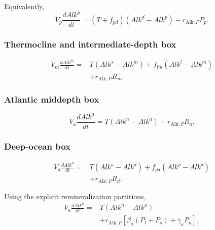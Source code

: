 \documentclass[11pt]{article}
\begin{document}
Equivalently,
\begin{equation}
V_p\frac{dAlk^p}{dt}
=
\left(T+f_{pd}\right)
\left(
Alk^d-Alk^p
\right)
-
r_{\mathrm{Alk}:P}P_p.
\label{eq:seven_alk_p_compact}
\end{equation}

\subsubsection{Thermocline and intermediate-depth box}

\begin{equation}
\begin{split}
V_m\frac{dAlk^m}{dt}
={}&
T
\left(
Alk^s-Alk^m
\right)
+
f_{lm}
\left(
Alk^l-Alk^m
\right)
\\
&+
r_{\mathrm{Alk}:P}R_m.
\end{split}
\label{eq:seven_alk_m}
\end{equation}

\subsubsection{Atlantic middepth box}

\begin{equation}
V_a\frac{dAlk^a}{dt}
=
T
\left(
Alk^n-Alk^a
\right)
+
r_{\mathrm{Alk}:P}R_a.
\label{eq:seven_alk_a}
\end{equation}

\subsubsection{Deep-ocean box}

\begin{equation}
\begin{split}
V_d\frac{dAlk^d}{dt}
={}&
T
\left(
Alk^a-Alk^d
\right)
+
f_{pd}
\left(
Alk^p-Alk^d
\right)
\\
&+
r_{\mathrm{Alk}:P}R_d.
\end{split}
\label{eq:seven_alk_d}
\end{equation}

Using the explicit remineralization partitions,
\begin{equation}
\begin{split}
V_a\frac{dAlk^a}{dt}
={}&
T
\left(
Alk^n-Alk^a
\right)
\\
&+
r_{\mathrm{Alk}:P}
\left[
\beta_a
\left(
P_l+P_s
\right)
+
\gamma_aP_n
\right],
\end{split}
\label{eq:seven_alk_a_expanded}
\end{equation}
\end{document}
